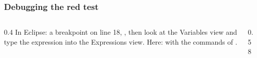 \documentclass[aspectratio=169,10pt,compress]{beamer}
\begin{document}
\begin{frame}[t,fragile] \frametitle{Debugging the red test}
  \begin{columns}[T]
    \begin{column}{0.4\textwidth}
      \small In Eclipse: a breakpoint on line 18, , then look at the Variables view and
      type the expression into the Expressions view. Here:  with the commands of .
    \end{column}
    \begin{column}{0.58\textwidth}
    \end{column}
  \end{columns}
\end{frame}
\end{document}
